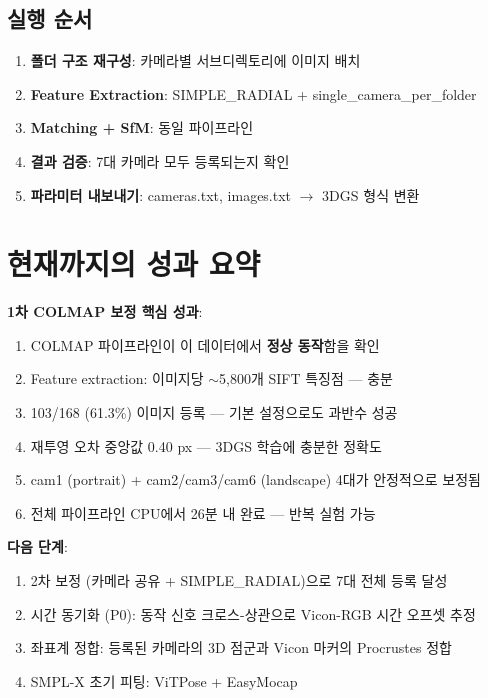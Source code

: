 \documentclass[11pt, a4paper]{report}
\begin{document}
\section{실행 순서}

\begin{enumerate}[leftmargin=*]
  \item \textbf{폴더 구조 재구성}: 카메라별 서브디렉토리에 이미지 배치
  \item \textbf{Feature Extraction}: SIMPLE\_RADIAL + single\_camera\_per\_folder
  \item \textbf{Matching + SfM}: 동일 파이프라인
  \item \textbf{결과 검증}: 7대 카메라 모두 등록되는지 확인
  \item \textbf{파라미터 내보내기}: cameras.txt, images.txt $\rightarrow$ 3DGS 형식 변환
\end{enumerate}


\chapter{현재까지의 성과 요약}

\begin{successbox}
\textbf{1차 COLMAP 보정 핵심 성과}:
\begin{enumerate}[nosep]
  \item COLMAP 파이프라인이 이 데이터에서 \textbf{정상 동작}함을 확인
  \item Feature extraction: 이미지당 $\sim$5,800개 SIFT 특징점 --- 충분
  \item 103/168 (61.3\%) 이미지 등록 --- 기본 설정으로도 과반수 성공
  \item 재투영 오차 중앙값 0.40 px --- 3DGS 학습에 충분한 정확도
  \item cam1 (portrait) + cam2/cam3/cam6 (landscape) 4대가 안정적으로 보정됨
  \item 전체 파이프라인 CPU에서 26분 내 완료 --- 반복 실험 가능
\end{enumerate}
\end{successbox}

\begin{nextbox}
\textbf{다음 단계}:
\begin{enumerate}[nosep]
  \item 2차 보정 (카메라 공유 + SIMPLE\_RADIAL)으로 7대 전체 등록 달성
  \item 시간 동기화 (P0): 동작 신호 크로스-상관으로 Vicon-RGB 시간 오프셋 추정
  \item 좌표계 정합: 등록된 카메라의 3D 점군과 Vicon 마커의 Procrustes 정합
  \item SMPL-X 초기 피팅: ViTPose + EasyMocap
\end{enumerate}
\end{nextbox}
\end{document}
